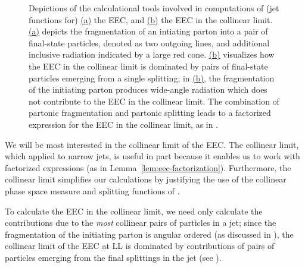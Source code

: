 \begin{figure}[t!]
    \caption[Depictions of jet function calculations for the EEC.]{
    Depictions of the calculational tools involved in computations of (jet functions for) \hyperref[fig:shower:cartoon:collinear1]{(a)} the EEC, and \hyperref[fig:shower:cartoon:collinear2]{(b)} the EEC in the collinear limit.
    \hyperref[fig:shower:cartoon:collinear1]{(a)} depicts the fragmentation of an intiating parton into a pair of final-state particles, denoted as two outgoing lines, and additional inclusive radiation indicated by a large red cone.
    \hyperref[fig:shower:cartoon:collinear2]{(b)} visualizes how the EEC in the collinear limit is dominated by pairs of final-state particles emerging from a single splitting;
    in \hyperref[fig:shower:cartoon:collinear2]{(b)}, the fragmentation of the initiating parton produces wide-angle radiation which does not contribute to the EEC in the collinear limit.
    The combination of partonic fragmentation and partonic splitting leads to a factorized expression for the EEC in the collinear limit, as in .
    }
    \label{fig:shower:cartoon:collinear}
\end{figure}

We will be most interested in the collinear limit of the EEC.
%
The collinear limit, which applied to narrow jets, is useful in part because it enables us to work with factorized expressions (as in Lemma~\ref{lem:eec-factorization}).
%
Furthermore, the collinear limit simplifies our calculations by justifying the use of the collinear phase space measure and splitting functions of .



To calculate the EEC in the collinear limit, we need only calculate the contributions due to the \emph{most} collinear pairs of particles in a jet;
%
since the fragmentation of the initiating parton is angular ordered (as discussed in ), the collinear limit of the EEC at LL is dominated by contributions of pairs of particles emerging from the final splittings in the jet (see ).

